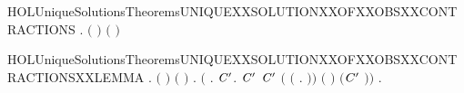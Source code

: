 \begin{SaveVerbatim}{HOLUniqueSolutionsTheoremsUNIQUEXXSOLUTIONXXOFXXOBSXXCONTRACTIONS}
\HOLTokenTurnstile{} \HOLSymConst{\HOLTokenForall{}}  .
         \HOLSymConst{\HOLTokenConj{}}   \ensuremath{(} \ensuremath{)} \HOLSymConst{\HOLTokenConj{}}   \ensuremath{(} \ensuremath{)} \HOLSymConst{\HOLTokenImp{}}
         
\end{SaveVerbatim}
\newcommand{\HOLUniqueSolutionsTheoremsUNIQUEXXSOLUTIONXXOFXXOBSXXCONTRACTIONS}{\UseVerbatim{HOLUniqueSolutionsTheoremsUNIQUEXXSOLUTIONXXOFXXOBSXXCONTRACTIONS}}
\begin{SaveVerbatim}{HOLUniqueSolutionsTheoremsUNIQUEXXSOLUTIONXXOFXXOBSXXCONTRACTIONSXXLEMMA}
\HOLTokenTurnstile{} \HOLSymConst{\HOLTokenForall{}}  .
         \HOLSymConst{\HOLTokenConj{}}   \ensuremath{(} \ensuremath{)} \HOLSymConst{\HOLTokenConj{}}   \ensuremath{(} \ensuremath{)} \HOLSymConst{\HOLTokenImp{}}
       \HOLSymConst{\HOLTokenForall{}}.
             \HOLSymConst{\HOLTokenImp{}}
           \ensuremath{(}\HOLSymConst{\HOLTokenForall{}} .
                  \HOLTokenWeakTransBegin{} \HOLTokenWeakTransEnd {} \HOLSymConst{\HOLTokenImp{}}
                \HOLSymConst{\HOLTokenExists{}}\ensuremath{\HOLBoundVar{C}\sp{\prime}}.
                     \ensuremath{\HOLBoundVar{C}\sp{\prime}} \HOLSymConst{\HOLTokenConj{}}   \ensuremath{\HOLBoundVar{C}\sp{\prime}}  \HOLSymConst{\HOLTokenConj{}}
                    \ensuremath{(}  \ensuremath{(}\HOLTokenLambda{} .  \HOLTokenWeakTransBegin{} \HOLTokenWeakTransEnd {}\ensuremath{)}\ensuremath{)} \ensuremath{(} \ensuremath{)}
                      \ensuremath{(}\ensuremath{\HOLBoundVar{C}\sp{\prime}} \ensuremath{)}\ensuremath{)} \HOLSymConst{\HOLTokenConj{}}
           \HOLSymConst{\HOLTokenForall{}}.

\end{SaveVerbatim}
